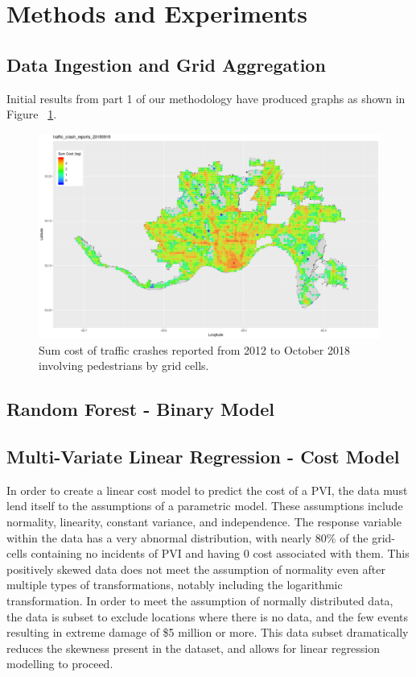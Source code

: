 \documentclass{llncs}
\begin{document}
\section{Methods and Experiments}
%
\subsection{Data Ingestion and Grid Aggregation}

Initial results from part 1 of our methodology have produced graphs as shown in Figure ~\ref{figure:SumCrashPlot}. \newline

\FloatBarrier
\begin{figure}
 	\includegraphics[width=\textwidth, height=\textheight, keepaspectratio]{trafficcrashreports20180918nonpedestriansumcostmapped2grid.png}
 	\caption{Sum cost of traffic crashes reported from 2012 to October 2018 involving pedestrians by grid cells.}
	\label{figure:SumCrashPlot}

\end{figure}
\FloatBarrier

\subsection{Random Forest - Binary Model}

\subsection{Multi-Variate Linear Regression - Cost Model}
In order to create a linear cost model to predict the cost of a PVI, the data must lend itself to the assumptions of a parametric model. These assumptions include normality, linearity, constant variance, and independence. The response variable within the data has a very abnormal distribution, with nearly 80\% of the grid-cells containing no incidents of PVI and having 0 cost associated with them. This positively skewed data does not meet the assumption of normality even after multiple types of transformations, notably including the logarithmic transformation. In order to meet the assumption of normally distributed data, the data is subset to exclude locations where there is no data, and the few events resulting in extreme damage of \$5 million or more. This data subset dramatically reduces the skewness present in the dataset, and allows for linear regression modelling to proceed.
\end{document}
